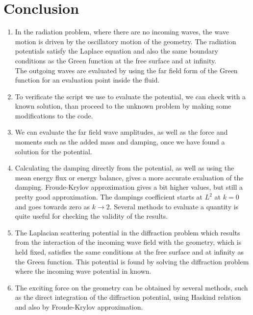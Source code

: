 \documentclass[a4paper,10pt]{article}
\begin{document}
\section{Conclusion}
\begin{enumerate}
\item In the radiation problem, where there are no incoming waves, the wave motion is driven by the oscillatory motion of the geometry. The radiation potentials satisfy the Laplace equation and also the same boundary conditions as the Green function at the free surface and at infinity.\\
The outgoing waves are evaluated by using the far field form of the Green function for an evaluation point inside the fluid.\\

\item To verificate the script we use to evaluate the potential, we can check with a known solution, than proceed to the unknown problem by making some modifications to the code.

\item We can evaluate the far field wave amplitudes, as well as the force and moments such as the added mass and damping, once we have found a solution for the potential.

\item Calculating the damping directly from the potential, as well as using the mean energy flux or energy balance, gives a more accurate evaluation of the damping. Froude-Krylov approximation gives a bit higher values, but still a pretty good approximation. The dampings coefficient starts at $L^2$ at $k=0$ and goes towards zero as $k \rightarrow 2$. Several methods to evaluate a quantity is quite useful for checking the validity of the results.

\item The Laplacian scattering potential in the diffraction problem which results from the interaction of the incoming wave field with the geometry, which is held fixed, satisfies the same conditions at the free surface and at infinity as the Green function. This potential is found by solving the diffraction problem where the incoming wave potential in known.

\item The exciting force on the geometry can be obtained by several methods, such as the direct integration of the diffraction potential, using Haskind relation and also by Froude-Krylov approximation.
\end{enumerate}
\end{document}
